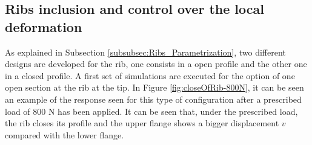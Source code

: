   \subsection{Ribs inclusion and control over the local deformation} \label{subsec:ribs_results_model}

    As explained in Subsection \ref{subsubsec:Ribs_Parametrization}, two different designs are developed for the rib, one consists in a open profile and the other one in a closed profile. A first set of simulations are executed for the option of one open section at the rib at the tip. In Figure \ref{fig:closeOfRib-800N}, it can be seen an example of the response seen for this type of configuration after a prescribed load of 800 N has been applied. It can be seen that, under the prescribed load, the rib closes its profile and the upper flange shows a bigger displacement $v$ compared with the lower flange.

